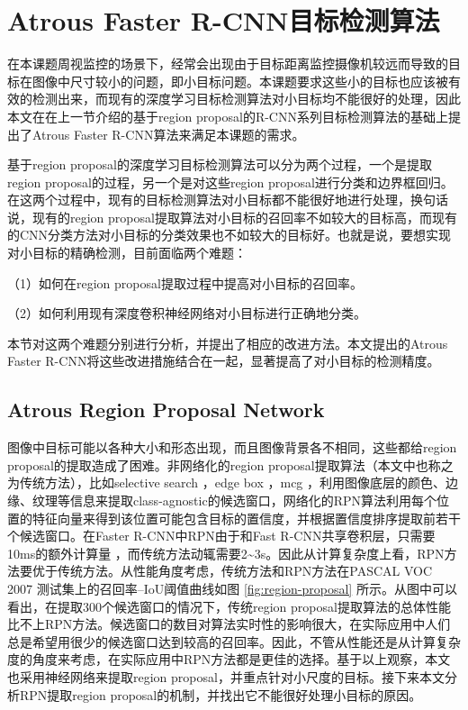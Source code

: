 \section{Atrous Faster R-CNN目标检测算法}
在本课题周视监控的场景下，经常会出现由于目标距离监控摄像机较远而导致的目标在图像中尺寸较小的问题，即小目标问题。本课题要求这些小的目标也应该被有效的检测出来，而现有的深度学习目标检测算法对小目标均不能很好的处理，因此本文在在上一节介绍的基于region proposal的R-CNN系列目标检测算法的基础上提出了Atrous Faster R-CNN算法来满足本课题的需求。

基于region proposal的深度学习目标检测算法可以分为两个过程，一个是提取region proposal的过程，另一个是对这些region proposal进行分类和边界框回归。在这两个过程中，现有的目标检测算法对小目标都不能很好地进行处理，换句话说，现有的region proposal提取算法对小目标的召回率不如较大的目标高，而现有的CNN分类方法对小目标的分类效果也不如较大的目标好。也就是说，要想实现对小目标的精确检测，目前面临两个难题：
\begin{namelist}{}
	\item（1）如何在region proposal提取过程中提高对小目标的召回率。
	\item（2）如何利用现有深度卷积神经网络对小目标进行正确地分类。
\end{namelist}
本节对这两个难题分别进行分析，并提出了相应的改进方法。本文提出的Atrous Faster R-CNN将这些改进措施结合在一起，显著提高了对小目标的检测精度。

\subsection{Atrous Region Proposal Network}
图像中目标可能以各种大小和形态出现，而且图像背景各不相同，这些都给region proposal的提取造成了困难。非网络化的region proposal提取算法（本文中也称之为传统方法），比如selective search \cite{selective-search}，edge box \cite{edge-box}，mcg \cite{mcg}，利用图像底层的颜色、边缘、纹理等信息来提取class-agnostic的候选窗口，网络化的RPN算法利用每个位置的特征向量来得到该位置可能包含目标的置信度，并根据置信度排序提取前若干个候选窗口。在Faster R-CNN中RPN由于和Fast R-CNN共享卷积层，只需要10ms的额外计算量 \cite{faster rcnn}，而传统方法动辄需要2\textasciitilde3s。因此从计算复杂度上看，RPN方法要优于传统方法。从性能角度考虑，传统方法和RPN方法在PASCAL VOC 2007 \cite{pascal-voc-2007} 测试集上的召回率--IoU阈值曲线如图 \ref{fig:region-proposal} 所示。从图中可以看出，在提取300个候选窗口的情况下，传统region proposal提取算法的总体性能比不上RPN方法。候选窗口的数目对算法实时性的影响很大，在实际应用中人们总是希望用很少的候选窗口达到较高的召回率。因此，不管从性能还是从计算复杂度的角度来考虑，在实际应用中RPN方法都是更佳的选择。基于以上观察，本文也采用神经网络来提取region proposal，并重点针对小尺度的目标。接下来本文分析RPN提取region proposal的机制，并找出它不能很好处理小目标的原因。

